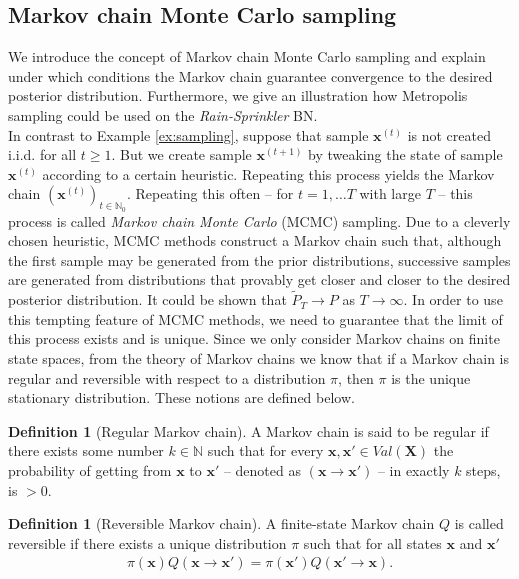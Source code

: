 \documentclass[a4paper, twoside, 11pt]{report}
\theoremstyle{plain}
\theoremstyle{definition}
\newtheorem{definition}[thm]{Definition}
\theoremstyle{remark}
\newcommand{\bfx}{{\mathbf{x}}}
\newcommand{\bfX}{{\mathbf{X}}}
\def\N{{\mathbb N}}
\begin{document}
\subsection{Markov chain Monte Carlo sampling}
We introduce the concept of Markov chain Monte Carlo sampling and explain under which conditions the Markov chain guarantee convergence to the desired posterior distribution. Furthermore, we give an illustration how Metropolis sampling could be used on the \textit{Rain-Sprinkler} BN. \\

In contrast to Example \ref{ex:sampling}, suppose that sample $\bfx^{(t)}$ is not created i.i.d. for all $t \geq 1$. But we create sample $\bfx^{(t+1)}$ by tweaking the state of sample $\bfx^{(t)}$ according to a certain heuristic. Repeating this process yields the Markov chain $(\bfx^{(t)})_{t \in \N_0}$. Repeating this often -- for $t = 1, \ldots T$ with large $T$  -- this process is called \textit{Markov chain Monte Carlo} (MCMC) sampling. 
Due to a cleverly chosen heuristic, MCMC methods construct a Markov chain such that, although the first sample may be generated from the prior distributions, successive samples are generated from distributions that provably get closer and closer to the desired posterior distribution. It could be shown \citep[p.~517]{koller2009probabilistic} that $\widetilde{P}_T \to P$ as $T \to \infty$. In order to use this tempting feature of MCMC methods, we need to guarantee that the limit of this process exists and is unique. Since we only consider Markov chains on finite state spaces, from the theory of Markov chains we know that if a Markov chain is regular and reversible with respect to a distribution $\pi$, then $\pi$ is the unique stationary distribution. These notions are defined below.



\begin{definition}[Regular Markov chain]
A Markov chain is said to be regular if there exists some number $k \in \N$ such that for every $\bfx, \bfx' \in Val(\bfX)$ the probability of getting from $\bfx$ to $\bfx'$ -- denoted as $(\bfx \to \bfx')$ -- in exactly $k$ steps, is $> 0$. 
\end{definition}

\begin{definition}[Reversible Markov chain]
A finite-state Markov chain $Q$ is called reversible if there exists a unique distribution $\pi$ such that for all states $\bfx$ and $\bfx'$
\begin{align}
\pi(\bfx) Q(\bfx \to \bfx') = \pi(\bfx') Q(\bfx' \to \bfx).
\end{align}
\end{definition}
\end{document}
